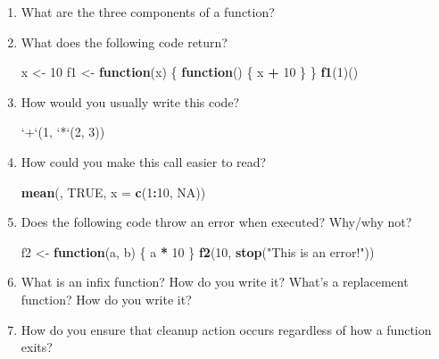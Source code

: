 \documentclass[]{book}
\newenvironment{Shaded}{\begin{snugshade}}{\end{snugshade}}
\newcommand{\KeywordTok}[1]{\textcolor[rgb]{0.13,0.29,0.53}{\textbf{#1}}}
\newcommand{\DataTypeTok}[1]{\textcolor[rgb]{0.13,0.29,0.53}{#1}}
\newcommand{\DecValTok}[1]{\textcolor[rgb]{0.00,0.00,0.81}{#1}}
\newcommand{\StringTok}[1]{\textcolor[rgb]{0.31,0.60,0.02}{#1}}
\newcommand{\OtherTok}[1]{\textcolor[rgb]{0.56,0.35,0.01}{#1}}
\newcommand{\ControlFlowTok}[1]{\textcolor[rgb]{0.13,0.29,0.53}{\textbf{#1}}}
\newcommand{\OperatorTok}[1]{\textcolor[rgb]{0.81,0.36,0.00}{\textbf{#1}}}
\newcommand{\NormalTok}[1]{#1}
\theoremstyle{definition}
\theoremstyle{definition}
\theoremstyle{definition}
\theoremstyle{remark}
\begin{document}
\begin{enumerate}
\def\labelenumi{\arabic{enumi}.}
\item
  What are the three components of a function?
\item
  What does the following code return?

\begin{Shaded}
\begin{Highlighting}[]
\NormalTok{x <-}\StringTok{ }\DecValTok{10}
\NormalTok{f1 <-}\StringTok{ }\ControlFlowTok{function}\NormalTok{(x) \{}
  \ControlFlowTok{function}\NormalTok{() \{}
\NormalTok{    x }\OperatorTok{+}\StringTok{ }\DecValTok{10}
\NormalTok{  \}}
\NormalTok{\}}
\KeywordTok{f1}\NormalTok{(}\DecValTok{1}\NormalTok{)()}
\end{Highlighting}
\end{Shaded}
\item
  How would you usually write this code?

\begin{Shaded}
\begin{Highlighting}[]
\StringTok{`}\DataTypeTok{+}\StringTok{`}\NormalTok{(}\DecValTok{1}\NormalTok{, }\StringTok{`}\DataTypeTok{*}\StringTok{`}\NormalTok{(}\DecValTok{2}\NormalTok{, }\DecValTok{3}\NormalTok{))}
\end{Highlighting}
\end{Shaded}
\item
  How could you make this call easier to read?

\begin{Shaded}
\begin{Highlighting}[]
\KeywordTok{mean}\NormalTok{(, }\OtherTok{TRUE}\NormalTok{, }\DataTypeTok{x =} \KeywordTok{c}\NormalTok{(}\DecValTok{1}\OperatorTok{:}\DecValTok{10}\NormalTok{, }\OtherTok{NA}\NormalTok{))}
\end{Highlighting}
\end{Shaded}
\item
  Does the following code throw an error when executed? Why/why not?

\begin{Shaded}
\begin{Highlighting}[]
\NormalTok{f2 <-}\StringTok{ }\ControlFlowTok{function}\NormalTok{(a, b) \{}
\NormalTok{  a }\OperatorTok{*}\StringTok{ }\DecValTok{10}
\NormalTok{\}}
\KeywordTok{f2}\NormalTok{(}\DecValTok{10}\NormalTok{, }\KeywordTok{stop}\NormalTok{(}\StringTok{"This is an error!"}\NormalTok{))}
\end{Highlighting}
\end{Shaded}
\item
  What is an infix function? How do you write it? What's a replacement
  function? How do you write it?
\item
  How do you ensure that cleanup action occurs regardless of how a
  function exits?
\end{enumerate}
\end{document}
